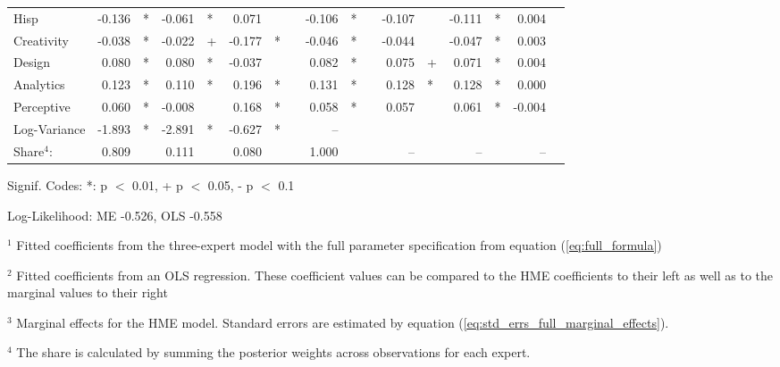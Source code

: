 \documentclass[12pt]{article}
\theoremstyle{definition}
\begin{document}
\begin{landscape}
\begin{table}
\begin{threeparttable}
\begin{tabular}[l]{l r l r l r l c r l c r l r l r l}
  Hisp                  & -0.136 & *      & -0.061 & *      &  0.071 &        && -0.106 & *     && -0.107 &          & -0.111 & *        &  0.004 &        \\
  Creativity            & -0.038 & *      & -0.022 & +      & -0.177 & *      && -0.046 & *     && -0.044 &          & -0.047 & *        &  0.003 &        \\
  Design                &  0.080 & *      &  0.080 & *      & -0.037 &        &&  0.082 & *     &&  0.075 & +        &  0.071 & *        &  0.004 &        \\
  Analytics             &  0.123 & *      &  0.110 & *      &  0.196 & *      &&  0.131 & *     &&  0.128 & *        &  0.128 & *        &  0.000 &        \\
  Perceptive            &  0.060 & *      & -0.008 &        &  0.168 & *      &&  0.058 & *     &&  0.057 &          &  0.061 & *        & -0.004 &        \\
  Log-Variance          & -1.893 & *      & -2.891 & *      & -0.627 & *      &&  --    &       &&  &          &  &          &  &        \\
  \cmidrule(l){2-3} \cmidrule(l){4-5} \cmidrule(l){6-7} \cmidrule(l){9-10} \cmidrule(l){12-13} \cmidrule(l){14-15} \cmidrule(l){16-17}
  Share$^{4}$:          & 0.809  &        & 0.111  &      & 0.080 &           &&  1.000 &       &&  --    &          &  --    &          &  --    &        \\
  \cmidrule{1-17}
        \end{tabular}
  
        \begin{tablenotes}
          \item Signif. Codes: *: p $<$ 0.01, + p $<$ 0.05, - p $<$ 0.1
          \item Log-Likelihood: ME -0.526, OLS -0.558
          \item $^{1}$ Fitted coefficients from the three-expert model with the full parameter specification from equation (\ref{eq:full_formula})
          \item $^{2}$ Fitted coefficients from an OLS regression. These coefficient values can be compared to the HME coefficients to their left as well as to the marginal values to their right
          \item $^{3}$ Marginal effects for the HME model. Standard errors are estimated by equation (\ref{eq:std_errs_full_marginal_effects}).
          \item $^{4}$ The share is calculated by summing the posterior weights across observations for each expert.
  
        \end{tablenotes} \label{tbl:3W_full_regressions_results}
  
  
      \end{threeparttable}
  
  \end{table}
  \end{landscape}
  
\end{document}
